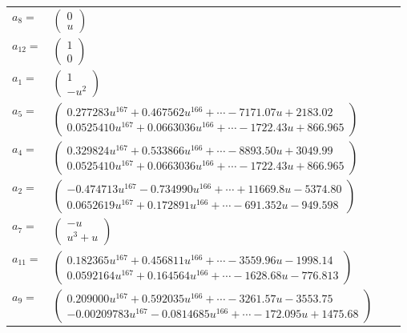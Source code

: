 \documentclass[1p]{elsarticle_modified}
\theoremstyle{definition}
\begin{document}
\begin{tabular}{m{7pt} m{180pt} m{7pt} m{180pt} }
\flushright $a_{8}=$&$\begin{pmatrix}0\\u\end{pmatrix}$ \\
\flushright $a_{12}=$&$\begin{pmatrix}1\\0\end{pmatrix}$ \\
\flushright $a_{1}=$&$\begin{pmatrix}1\\- u^2\end{pmatrix}$ \\
\flushright $a_{5}=$&$\begin{pmatrix}0.277283 u^{167}+0.467562 u^{166}+\cdots-7171.07 u+2183.02\\0.0525410 u^{167}+0.0663036 u^{166}+\cdots-1722.43 u+866.965\end{pmatrix}$ \\
\flushright $a_{4}=$&$\begin{pmatrix}0.329824 u^{167}+0.533866 u^{166}+\cdots-8893.50 u+3049.99\\0.0525410 u^{167}+0.0663036 u^{166}+\cdots-1722.43 u+866.965\end{pmatrix}$ \\
\flushright $a_{2}=$&$\begin{pmatrix}-0.474713 u^{167}-0.734990 u^{166}+\cdots+11669.8 u-5374.80\\0.0652619 u^{167}+0.172891 u^{166}+\cdots-691.352 u-949.598\end{pmatrix}$ \\
\flushright $a_{7}=$&$\begin{pmatrix}- u\\u^3+u\end{pmatrix}$ \\
\flushright $a_{11}=$&$\begin{pmatrix}0.182365 u^{167}+0.456811 u^{166}+\cdots-3559.96 u-1998.14\\0.0592164 u^{167}+0.164564 u^{166}+\cdots-1628.68 u-776.813\end{pmatrix}$ \\
\flushright $a_{9}=$&$\begin{pmatrix}0.209000 u^{167}+0.592035 u^{166}+\cdots-3261.57 u-3553.75\\-0.00209783 u^{167}-0.0814685 u^{166}+\cdots-172.095 u+1475.68\end{pmatrix}$ \\

\end{tabular}
\end{document}
